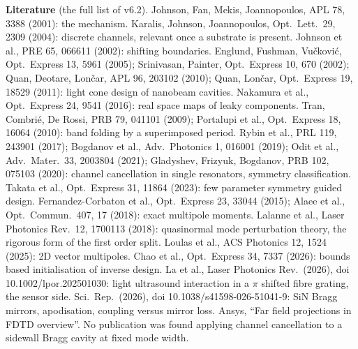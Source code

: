 \documentclass[11pt,a4paper]{article}
\begin{document}
\textbf{Literature} (the full list of v6.2). Johnson, Fan, Mekis, Joannopoulos, APL 78, 3388 (2001): the
mechanism. Karalis, Johnson, Joannopoulos, Opt.\ Lett.\ 29, 2309 (2004): discrete channels, relevant once a
substrate is present. Johnson et al., PRE 65, 066611 (2002): shifting boundaries. Englund, Fushman,
Vu\v ckovi\'c, Opt.\ Express 13, 5961 (2005); Srinivasan, Painter, Opt.\ Express 10, 670 (2002); Quan, Deotare,
Lon\v car, APL 96, 203102 (2010); Quan, Lon\v car, Opt.\ Express 19, 18529 (2011): light cone design of nanobeam
cavities. Nakamura et al., Opt.\ Express 24, 9541 (2016): real space maps of leaky components. Tran, Combri\'e,
De Rossi, PRB 79, 041101 (2009); Portalupi et al., Opt.\ Express 18, 16064 (2010): band folding by a
superimposed period. Rybin et al., PRL 119, 243901 (2017); Bogdanov et al., Adv.\ Photonics 1, 016001 (2019);
Odit et al., Adv.\ Mater.\ 33, 2003804 (2021); Gladyshev, Frizyuk, Bogdanov, PRB 102, 075103 (2020): channel
cancellation in single resonators, symmetry classification. Takata et al., Opt.\ Express 31, 11864 (2023): few
parameter symmetry guided design. Fernandez-Corbaton et al., Opt.\ Express 23, 33044 (2015); Alaee et al.,
Opt.\ Commun.\ 407, 17 (2018): exact multipole moments. Lalanne et al., Laser Photonics Rev.\ 12, 1700113 (2018):
quasinormal mode perturbation theory, the rigorous form of the first order split. Loulas et al., ACS Photonics
12, 1524 (2025): 2D vector multipoles. Chao et al., Opt.\ Express 34, 7337 (2026): bounds based initialisation of
inverse design. La et al., Laser Photonics Rev.\ (2026), doi 10.1002/lpor.202501030: light ultrasound interaction
in a $\pi$ shifted fibre grating, the sensor side. Sci.\ Rep.\ (2026), doi 10.1038/s41598-026-51041-9: SiN Bragg
mirrors, apodisation, coupling versus mirror loss. Ansys, ``Far field projections in FDTD overview''. No
publication was found applying channel cancellation to a sidewall Bragg cavity at fixed mode width.
\end{document}
